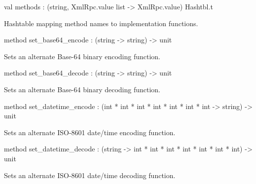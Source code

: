 \documentclass[11pt]{article}
\begin{document}
\begin{ocamldocobjectend}


\label{val:XmlRpcServer.base.methods}\begin{ocamldoccode}
val methods : (string, XmlRpc.value list -> XmlRpc.value) Hashtbl.t
\end{ocamldoccode}
\begin{ocamldocdescription}
Hashtable mapping method names to implementation functions.


\end{ocamldocdescription}


\label{method:XmlRpcServer.base.set-underscorebase64-underscoreencode}\begin{ocamldoccode}
method set_base64_encode : (string -> string) -> unit
\end{ocamldoccode}
\begin{ocamldocdescription}
Sets an alternate Base-64 binary encoding function.


\end{ocamldocdescription}


\label{method:XmlRpcServer.base.set-underscorebase64-underscoredecode}\begin{ocamldoccode}
method set_base64_decode : (string -> string) -> unit
\end{ocamldoccode}
\begin{ocamldocdescription}
Sets an alternate Base-64 binary decoding function.


\end{ocamldocdescription}


\label{method:XmlRpcServer.base.set-underscoredatetime-underscoreencode}\begin{ocamldoccode}
method set_datetime_encode :
  (int * int * int * int * int * int * int -> string) -> unit
\end{ocamldoccode}
\begin{ocamldocdescription}
Sets an alternate ISO-8601 date/time encoding function.


\end{ocamldocdescription}


\label{method:XmlRpcServer.base.set-underscoredatetime-underscoredecode}\begin{ocamldoccode}
method set_datetime_decode :
  (string -> int * int * int * int * int * int * int) -> unit
\end{ocamldoccode}
\begin{ocamldocdescription}
Sets an alternate ISO-8601 date/time decoding function.



\end{ocamldocdescription}
\end{ocamldocobjectend}
\end{document}
